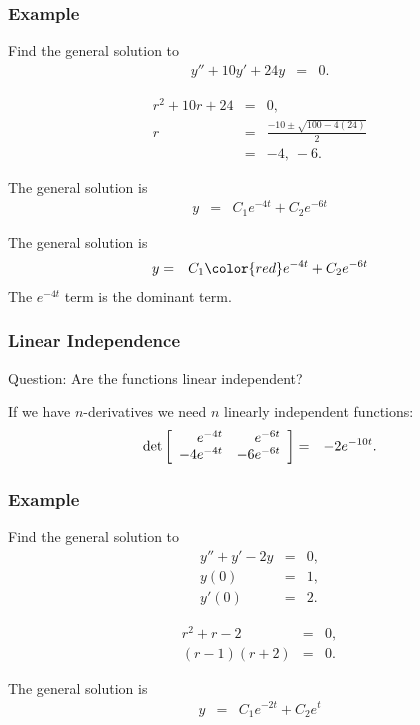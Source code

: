 \begin{frame}
  \frametitle{Example}

  Find the general solution to
  \begin{eqnarray*}
    y'' + 10 y' + 24y & = & 0.
  \end{eqnarray*}

  {
    \begin{eqnarray*}
      r^2 + 10r + 24 & = & 0, \\
      r & = & \frac{-10\pm\sqrt{100-4(24)}}{2} \\
      & = & -4,~ -6.
    \end{eqnarray*}
  }

  {
    The general solution is
    \begin{eqnarray*}
      y & = & C_1 e^{-4t} + C_2 e^{-6t}
    \end{eqnarray*}
  }

  {
    The general solution is
    \begin{eqnarray*}
      y & = & C_1 {\color{red}e^{-4t}} + C_2 e^{-6t}
    \end{eqnarray*}
    The $e^{-4t}$ term is the dominant term.
  }
  

\end{frame}

\begin{frame}
  \frametitle{Linear Independence}

  Question: Are the functions linear independent?

  {

    If we have $n$-derivatives we need $n$ linearly independent
    functions:
    \begin{eqnarray*}
      \mathrm{det}\left[ \begin{array}{rr} e^{-4t} & e^{-6t} \\ -4e^{-4t} & -6e^{-6t} \end{array} \right] 
      & = & -2 e^{-10t}.
    \end{eqnarray*}

  }
  
\end{frame}


\begin{frame}
  \frametitle{Example}

  Find the general solution to
  \begin{eqnarray*}
    y'' + y' - 2y & = & 0, \\
    y(0) & = & 1, \\
    y'(0) & = & 2.
  \end{eqnarray*}

  {
    \begin{eqnarray*}
      r^2 + r - 2 & = & 0, \\
      (r-1)(r+2) & = & 0.
    \end{eqnarray*}

    The general solution is
    \begin{eqnarray*}
      y & = & C_1 e^{-2t} + C_2 e^{t}
    \end{eqnarray*}

  }
  

\end{frame}

